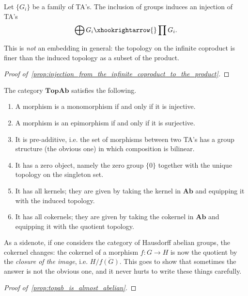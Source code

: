 \begin{proposition}\label{prop:injection_from_the_infinite_coproduct_to_the_product} Let $\{G_i\}$ be a family of TA's. The inclusion of groups induces an injection of TA's \[\bigoplus G_i \xhookrightarrow{} \prod G_i.\]
\end{proposition}
\begin{remark} This is \emph{not} an embedding in general: the topology on the infinite coproduct is finer than the induced topology as a subset of the product.
\end{remark}
\begin{proof}[Proof of~\cref{prop:injection_from_the_infinite_coproduct_to_the_product}] \TODO
\end{proof}

\begin{proposition}\label{prop:topab_is_almost_abelian} The category $\textbf{TopAb}$ satisfies the following.
\begin{enumerate}
\item[(i)] A morphism is a monomorphism if and only if it is injective.
\item[(ii)] A morphism is an epimorphism if and only if it is surjective.
\item[(iii)] It is pre-additive, i.e. the set of morphisms between two TA's has a group structure (the obvious one) in which composition is bilinear.
\item[(iv)] It has a zero object, namely the zero group $\{0\}$ together with the unique topology on the singleton set.
\item[(v)] It has all kernels; they are given by taking the kernel in $\textbf{Ab}$ and equipping it with the induced topology.
\item[(vi)] It has all cokernels; they are given by taking the cokernel in $\textbf{Ab}$ and equipping it with the quotient topology.
\end{enumerate}
\end{proposition}

\begin{remark} As a sidenote, if one considers the category of Hausdorff abelian groups, the cokernel changes: the cokernel of a morphism $f : G \rightarrow H$ is now the quotient by the \emph{closure of the image}, i.e. $H/\overline{f(G)}$. This goes to show that sometimes the answer is not the obvious one, and it never hurts to write these things carefully.
\end{remark}

\begin{proof}[Proof of~\cref{prop:topab_is_almost_abelian}] \TODO
\end{proof}

